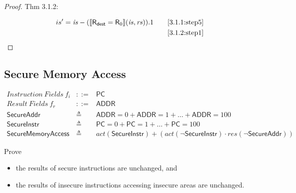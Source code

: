 \documentclass[12pt, letterpaper]{article}
\newcommand\interp[1]{\llbracket #1 \rrbracket}
\begin{document}
 \begin{proof}
 Thm 3.1.2:
 \par\nobreak
 {\fontsize{10pt}{12pt}\selectfont
   \begin{alignat}{2}
     \label{3.1.2:step1}
     is' &= \mathit{is} - (\interp{\mathsf{R}_{\mathsf{dest}} = \mathsf{R}_0}(\mathit{is},\mathit{rs})).1
     &&\quad \ref{3.1.1:step5} \\
     \label{3.1.2:step2}
     &\qedhere
     &&\quad \ref{3.1.2:step1} %
   \end{alignat}
 }%
     
 \end{proof}


\subsection{Secure Memory Access}
 \[
 \begin{array}{rcl}
   \mathit{Instruction\ Fields}\ f_i &::=& \mathsf{PC} \\
   \mathit{Result\ Fields}\ f_r &::=& \mathsf{ADDR} \\
   \mathsf{SecureAddr} &\triangleq& \mathsf{ADDR} = 0 + \mathsf{ADDR} = 1 + \ldots + \mathsf{ADDR} = 100 \\
   \mathsf{SecureInstr} &\triangleq& \mathsf{PC} = 0 + \mathsf{PC} = 1 + \ldots + \mathsf{PC} = 100 \\
   \mathsf{SecureMemoryAccess} &\triangleq&
     \mathit{act}(\mathsf{SecureInstr}) +
     (\mathit{act}(\neg\mathsf{SecureInstr}) \cdot
      \mathit{res}(\neg\mathsf{SecureAddr}))
      
 \end{array}
 \]

 Prove
 \begin{itemize}
     \item the results of secure instructions are unchanged, and
     \item the results of insecure instructions accessing insecure areas are unchanged.
 \end{itemize}
\end{document}

